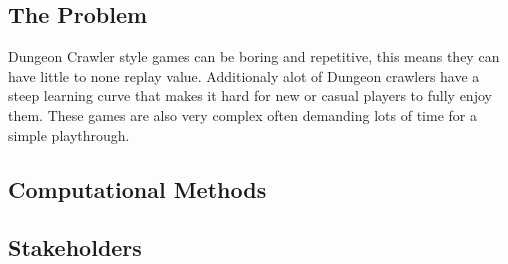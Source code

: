 \documentclass{article}
\begin{document}
        \subsection{The Problem}
        Dungeon Crawler style games can be boring and repetitive, this means they can have little to none replay value. Additionaly alot of Dungeon crawlers have a steep learning curve that makes it hard for new or casual players to fully enjoy them. These games are also very complex often demanding lots of time for a simple playthrough.\\
        \subsection{Computational Methods}
        
        \subsection{Stakeholders}
\end{document}
